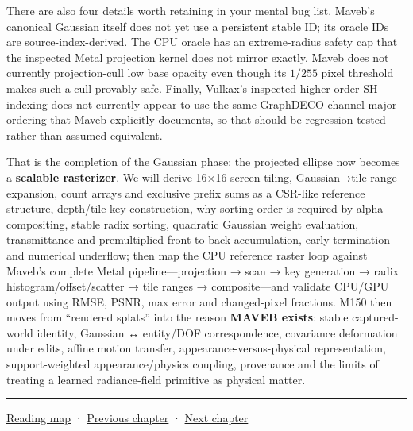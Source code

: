 There are also four details worth retaining in your mental bug list. Maveb's canonical Gaussian itself does not yet use a persistent stable ID; its oracle IDs are source-index-derived. The CPU oracle has an extreme-radius safety cap that the inspected Metal projection kernel does not mirror exactly. Maveb does not currently projection-cull low base opacity even though its \(1/255\) pixel threshold makes such a cull provably safe. Finally, Vulkax's inspected higher-order SH indexing does not currently appear to use the same GraphDECO channel-major ordering that Maveb explicitly documents, so that should be regression-tested rather than assumed equivalent.

That is the completion of the Gaussian phase: the projected ellipse now becomes a \textbf{scalable rasterizer}. We will derive 16×16 screen tiling, Gaussian→tile range expansion, count arrays and exclusive prefix sums as a CSR-like reference structure, depth/tile key construction, why sorting order is required by alpha compositing, stable radix sorting, quadratic Gaussian weight evaluation, transmittance and premultiplied front-to-back accumulation, early termination and numerical underflow; then map the CPU reference raster loop against Maveb's complete Metal pipeline---projection → scan → key generation → radix histogram/offset/scatter → tile ranges → composite---and validate CPU/GPU output using RMSE, PSNR, max error and changed-pixel fractions. M150 then moves from ``rendered splats'' into the reason \textbf{MAVEB exists}: stable captured-world identity, Gaussian ↔ entity/DOF correspondence, covariance deformation under edits, affine motion transfer, appearance-versus-physical representation, support-weighted appearance/physics coupling, provenance and the limits of treating a learned radiance-field primitive as physical matter.

\begin{center}\rule{0.5\linewidth}{0.5pt}\end{center}

\hyperref[volume-reading-map]{Reading map} · \hyperref[04-visual-computing-ii-ch037-gaussian-splatting-and-editable-captured-worlds]{Previous chapter} · \hyperref[04-visual-computing-ii-ch039-tiling-ordering-and-compositing-at-scale]{Next chapter}
